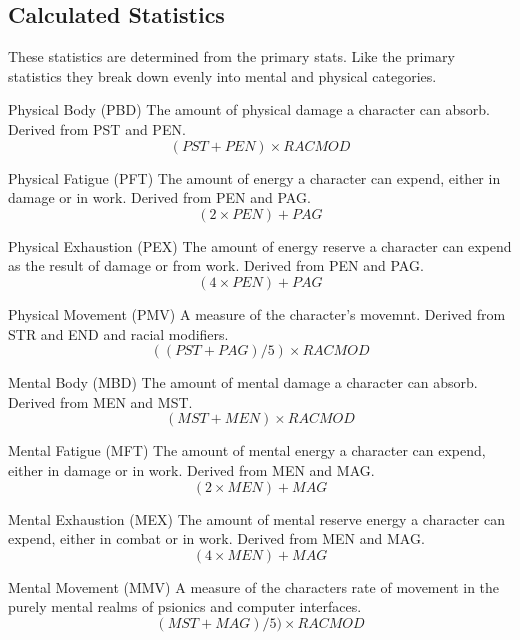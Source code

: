 \newpage
\subsection{Calculated Statistics}

These statistics are determined from the primary stats. Like the
primary statistics they break down evenly into mental and physical
categories.

\begin{relate}
	\item[Physical Body (PBD)]
	The amount of physical damage a character can absorb. Derived from PST
	and PEN.
	\[(PST+PEN) \times RAC MOD \]
	\item[Physical Fatigue (PFT)]
	The amount of energy a character can expend, either in damage or in
	work. Derived from PEN and PAG.
	\[(2 \times PEN)+PAG\]
	\item[Physical Exhaustion (PEX)]
	The amount of energy reserve a character can expend as the result of 
	damage or from work. Derived from PEN and PAG.
	\[(4 \times PEN)+PAG\]
	\item[Physical Movement (PMV)]
	A measure of the character's movemnt. Derived from STR and END and
	racial modifiers.
	\[((PST+PAG)/5) \times RAC MOD\]
	\item[Mental Body (MBD)]
	The amount of mental damage a character can absorb. Derived from MEN and MST.
	\[(MST+MEN) \times RAC MOD\]
	\item[Mental Fatigue (MFT)]
	The amount of mental energy a character can expend, either in damage
	or in work. Derived from MEN and MAG.
	\[(2 \times MEN)+MAG\]
	\item[Mental Exhaustion (MEX)]
	The amount of mental reserve energy a character can expend, either in combat
	or in work. Derived from MEN and MAG.
	\[(4 \times MEN)+MAG\]
	\item[Mental Movement (MMV)]
	A measure of the characters rate of movement in the purely mental 
	realms of psionics and computer interfaces.
	\[(MST+MAG)/5)\times RAC MOD \]


\end{relate}
